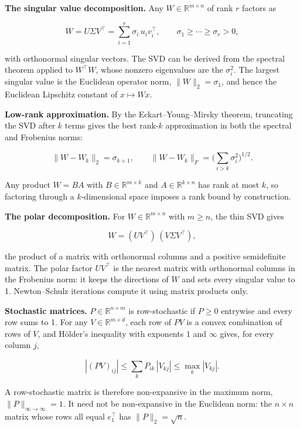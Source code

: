 \textbf{The singular value decomposition.} Any \(W \in
\mathbb{R}^{m\times n}\) of rank \(r\) factors as

\[
W = U \Sigma V^\top = \sum_{i=1}^{r} \sigma_i\, u_i v_i^\top, \qquad \sigma_1 \ge \cdots \ge \sigma_r > 0,
\]

with orthonormal singular vectors. The SVD can be derived from the
spectral theorem applied to \(W^{\top}W\), whose nonzero eigenvalues are
the \(\sigma_i^{2}\). The largest singular value is the Euclidean operator
norm, \(\|W\|_{2} = \sigma_{1}\), and hence the Euclidean Lipschitz
constant of \(x \mapsto Wx\).

\textbf{Low-rank approximation.} By the Eckart--Young--Mirsky theorem,
truncating the SVD after \(k\) terms gives the best rank-\(k\) approximation in
both the spectral and Frobenius norms:

\[
\|W - W_k\|_2 = \sigma_{k+1}, \qquad \|W - W_k\|_F = \Big(\sum_{i > k} \sigma_i^2\Big)^{1/2}.
\]

Any product \(W = BA\) with \(B \in \mathbb{R}^{m\times k}\) and \(A \in
\mathbb{R}^{k\times n}\) has rank at most \(k\), so factoring through a
\(k\)-dimensional space imposes a rank bound by construction.

\textbf{The polar decomposition.} For \(W \in \mathbb{R}^{m\times n}\)
with \(m \ge n\), the thin SVD gives

\[
W = (U V^\top)\,(V \Sigma V^\top),
\]

the product of a matrix with orthonormal columns and a positive
semidefinite matrix. The polar factor \(UV^{\top}\) is the nearest
matrix with orthonormal columns in the Frobenius norm: it keeps the
directions of \(W\) and sets every singular value to 1. Newton--Schulz
iterations compute it using matrix products only.

\textbf{Stochastic matrices.} \(P \in \mathbb{R}^{n\times m}\) is
row-stochastic if \(P \ge 0\) entrywise and every row sums to 1. For any \(V \in
\mathbb{R}^{m\times d}\), each row of \(PV\) is a convex combination of
rows of \(V\), and Hölder's inequality with exponents \(1\) and \(\infty\) gives, for
every column \(j\),

\[
|(PV)_{ij}| \le \sum_k P_{ik}\,|V_{kj}| \le \max_k |V_{kj}|.
\]

A row-stochastic matrix is therefore non-expansive in the maximum norm,
\(\|P\|_{\infty\to\infty} = 1\). It need not be non-expansive in the Euclidean norm: the
\(n \times n\) matrix whose rows all equal \(e_{1}^{\top}\) has \(\|P\|_{2} = \sqrt{n}\).

